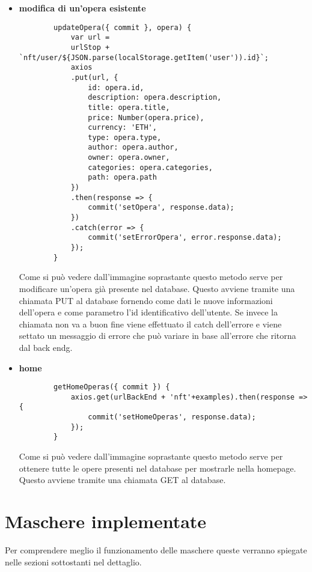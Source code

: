 \begin{itemize}
	\item \textbf{modifica di un'opera esistente}
	\begin{lstlisting}
		updateOpera({ commit }, opera) {
			var url =
			urlStop + `nft/user/${JSON.parse(localStorage.getItem('user')).id}`;
			axios
			.put(url, {
				id: opera.id,
				description: opera.description,
				title: opera.title,
				price: Number(opera.price),
				currency: 'ETH',
				type: opera.type,
				author: opera.author,
				owner: opera.owner,
				categories: opera.categories,
				path: opera.path
			})
			.then(response => {
				commit('setOpera', response.data);
			})
			.catch(error => {
				commit('setErrorOpera', error.response.data);
			});
		}
	\end{lstlisting}
	Come si può vedere dall'immagine soprastante questo metodo serve per modificare un'opera già presente nel database. Questo avviene tramite una chiamata PUT al database fornendo come dati le nuove informazioni dell'opera e come parametro l'id identificativo dell'utente. Se invece  la chiamata non va a buon fine viene effettuato il catch dell'errore e viene settato un messaggio di errore che può variare in base all'errore che ritorna dal \gls{back endg}.
	\item \textbf{home}
	\begin{lstlisting}
		getHomeOperas({ commit }) {
			axios.get(urlBackEnd + 'nft'+examples).then(response => {
				commit('setHomeOperas', response.data);
			});
		}
	\end{lstlisting}
	Come si può vedere dall'immagine soprastante questo metodo serve per ottenere tutte le opere presenti nel database per mostrarle nella homepage. Questo avviene tramite una chiamata GET al database.
\end{itemize}

\section{Maschere implementate}

Per comprendere meglio il funzionamento delle maschere queste verranno spiegate nelle sezioni sottostanti nel dettaglio.

